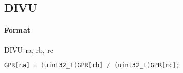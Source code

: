 \subsection{DIVU}


\paragraph{Format} DIVU ra, rb, rc

\begin{lstlisting}[language=C]
    GPR[ra] = (uint32_t)GPR[rb] / (uint32_t)GPR[rc];
\end{lstlisting}